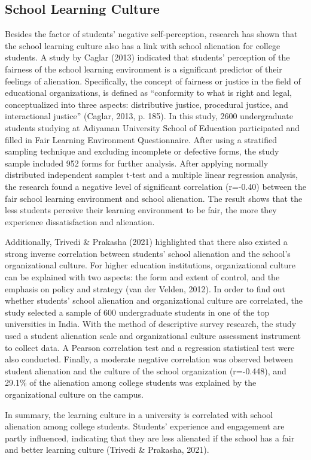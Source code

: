 \documentclass{scupi_apa_thesis}
\begin{document}
\subsection{School Learning Culture}
\par
Besides the factor of students’ negative self-perception, research has shown that 
the school learning culture also has a link with school alienation for college students. A study by 
Caglar (2013) indicated that students’ perception of the fairness of the school learning 
environment is a significant predictor of their feelings of alienation. Specifically, the concept of 
fairness or justice in the field of educational organizations, is defined as “conformity to what is 
right and legal, conceptualized into three aspects: distributive justice, procedural justice, and 
interactional justice” (Caglar, 2013, p. 185). In this study, 2600 undergraduate students studying 
at Adiyaman University School of Education participated and filled in Fair Learning 
Environment Questionnaire. After using a stratified sampling technique and excluding 
incomplete or defective forms, the study sample included 952 forms for further analysis. After 
applying normally distributed independent samples t-test and a multiple linear regression 
analysis, the research found a negative level of significant correlation (r=-0.40) between the fair 
school learning environment and school alienation. The result shows that the less students 
perceive their learning environment to be fair, the more they experience dissatisfaction and 
alienation.
\par
Additionally, Trivedi \& Prakasha (2021) highlighted that there also existed a strong 
inverse correlation between students’ school alienation and the school’s organizational culture. 
For higher education institutions, organizational culture can be explained with two aspects: the 
form and extent of control, and the emphasis on policy and strategy (van der Velden, 2012). In 
order to find out whether students’ school alienation and organizational culture are correlated, the 
study selected a sample of 600 undergraduate students in one of the top universities in India. 
With the method of descriptive survey research, the study used a student alienation scale and 
organizational culture assessment instrument to collect data. A Pearson correlation test and a 
regression statistical test were also conducted. Finally, a moderate negative correlation was 
observed between student alienation and the culture of the school organization (r=-0.448), and 
29.1\% of the alienation among college students was explained by the organizational culture on 
the campus.
\par
In summary, the learning culture in a university is correlated with school alienation 
among college students. Students’ experience and engagement are partly influenced, indicating 
that they are less alienated if the school has a fair and better learning culture (Trivedi \& 
Prakasha, 2021). 
\end{document}
